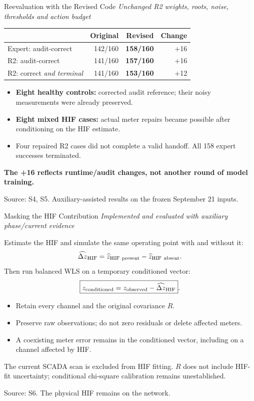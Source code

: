 \documentclass{beamer}
\newcommand{\src}[1]{\par\vfill\begin{minipage}{0.67\textwidth}\tiny\color{gray}Source: #1.\end{minipage}\par}
\newcommand{\scope}[1]{{\small\textit{#1}}\par\vspace{0.5em}}
\begin{document}
\begin{frame}{Reevaluation with the Revised Code}
  \scope{Unchanged R2 weights, roots, noise, thresholds and action budget}
  \small
  \begin{center}
    \renewcommand{\arraystretch}{1.3}
    \begin{tabular}{lrrr}
      \toprule
      & Original & Revised & Change \\
      \midrule
      Expert: audit-correct & 142/160 & \textbf{158/160} & +16 \\
      R2: audit-correct & 141/160 & \textbf{157/160} & +16 \\
      R2: correct \emph{and terminal} & 141/160 & \textbf{153/160} & +12 \\
      \bottomrule
    \end{tabular}
  \end{center}
  \begin{itemize}
    \setlength\itemsep{0.5em}
    \item \textbf{Eight healthy controls:} corrected audit reference; their noisy measurements were already preserved.
    \item \textbf{Eight mixed HIF cases:} actual meter repairs became possible after conditioning on the HIF estimate.
    \item Four repaired R2 cases did not complete a valid handoff. All 158 expert successes terminated.
  \end{itemize}
  \vspace{0.3em}
  \textbf{The +16 reflects runtime/audit changes, not another round of model training.}
  \src{S4, S5. Auxiliary-assisted results on the frozen September 21 inputs}
\end{frame}

\begin{frame}{Masking the HIF Contribution}
  \scope{Implemented and evaluated with auxiliary phase/current evidence}
  Estimate the HIF and simulate the same operating point with and without it:
  \[\widehat{\Delta z}_{\rm HIF}
    =\widehat z_{\rm HIF\ present}-\widehat z_{\rm HIF\ absent}.\]
  Then run balanced WLS on a temporary conditioned vector:
  \[\boxed{z_{\rm conditioned}=z_{\rm observed}-\widehat{\Delta z}_{\rm HIF}}.\]
  \begin{itemize}
    \item Retain every channel and the original covariance $R$.
    \item Preserve raw observations; do not zero residuals or delete affected meters.
    \item A coexisting meter error remains in the conditioned vector, including on a channel affected by HIF.
  \end{itemize}
  \small The current SCADA scan is excluded from HIF fitting. $R$ does not include HIF-fit uncertainty; conditional chi-square calibration remains unestablished.
  \src{S6. The physical HIF remains on the network}
\end{frame}
\end{document}
